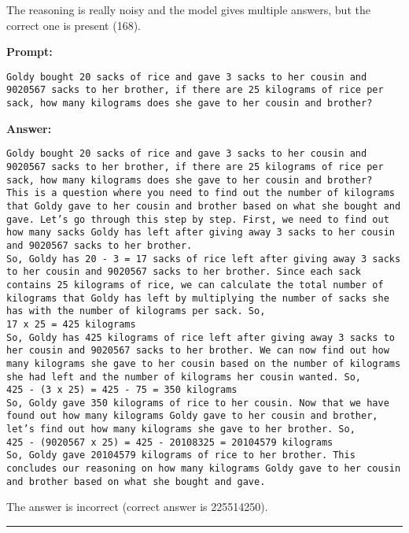 The reasoning is really noisy and the model gives multiple answers, but the correct one is present (168).
\begin{displayquote}
	\textbf{Prompt:}
	\begin{Verbatim}[fontsize=\small,breaklines]
Goldy bought 20 sacks of rice and gave 3 sacks to her cousin and 9020567 sacks to her brother, if there are 25 kilograms of rice per sack, how many kilograms does she gave to her cousin and brother?
	\end{Verbatim}
	\textbf{Answer:}
	\begin{Verbatim}[fontsize=\small,breaklines]
Goldy bought 20 sacks of rice and gave 3 sacks to her cousin and 9020567 sacks to her brother, if there are 25 kilograms of rice per sack, how many kilograms does she gave to her cousin and brother?
This is a question where you need to find out the number of kilograms that Goldy gave to her cousin and brother based on what she bought and gave. Let’s go through this step by step. First, we need to find out how many sacks Goldy has left after giving away 3 sacks to her cousin and 9020567 sacks to her brother.
So, Goldy has 20 - 3 = 17 sacks of rice left after giving away 3 sacks to her cousin and 9020567 sacks to her brother. Since each sack contains 25 kilograms of rice, we can calculate the total number of kilograms that Goldy has left by multiplying the number of sacks she has with the number of kilograms per sack. So,
17 x 25 = 425 kilograms
So, Goldy has 425 kilograms of rice left after giving away 3 sacks to her cousin and 9020567 sacks to her brother. We can now find out how many kilograms she gave to her cousin based on the number of kilograms she had left and the number of kilograms her cousin wanted. So,
425 - (3 x 25) = 425 - 75 = 350 kilograms
So, Goldy gave 350 kilograms of rice to her cousin. Now that we have found out how many kilograms Goldy gave to her cousin and brother, let’s find out how many kilograms she gave to her brother. So,
425 - (9020567 x 25) = 425 - 20108325 = 20104579 kilograms
So, Goldy gave 20104579 kilograms of rice to her brother. This concludes our reasoning on how many kilograms Goldy gave to her cousin and brother based on what she bought and gave.
	\end{Verbatim}
\end{displayquote}
The answer is incorrect (correct answer is 225514250).

\noindent\rule{\textwidth}{0.4pt}

